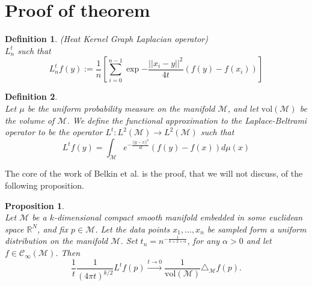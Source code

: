 \documentclass{article} %
\newtheorem{definition}{Definition}[section]
\newtheorem{prop}{Proposition}
\begin{document}




\newpage
{\LARGE {}}
\appendix

\section{Proof of theorem}

\begin{definition}{}(Heat Kernel Graph Laplacian operator)\\
	\label{def:Heat Kernel Graph Laplacian operator}
	$L_n^t$ such that
	$$L_n^tf(y) := \frac{1}{n}\left[ \sum_{i=0}^{n-1} \exp{-\frac{||x_i-y||^2}{4t}}\left(f(y)-f(x_i)\right)\right]$$
\end{definition}
\begin{definition}{} \cite{Belkin:2005:TTF:2138147.2138189}\\ \label{eq: my L^t} Let $\mu$ be the uniform probability measure on the manifold $\mathcal M$, and let $\text{vol}(\mathcal M)$ be the volume of $\mathcal M$. We define the functional approximation to the Laplace-Beltrami operator to be the operator $L^t: L^{2}(\mathcal{M}) \rightarrow L^{2}(\mathcal{M})$ such that
	\label{def:Functional approximation to the Laplace-Beltrami operator}
	$$ L^tf(y) = \int_{\mathcal M}e^{-\frac{||y-x||^2}{4t}}\left(f(y)-f(x)\right)d\mu(x)$$
\end{definition}

The core of the work of Belkin et al. is the proof, that we will not discuss, of the following proposition.

\begin{prop} \cite{Belkin:2005:TTF:2138147.2138189} \\
Let $\mathcal M$ be a $k$-dimensional compact smooth manifold embedded in some euclidean space $\mathbb R^N$, and fix $p\in\mathcal M$. Let the data points $x_1, \dots, x_n$ be sampled form a uniform distribution on the manifold $\mathcal M$. Set $t_n=n^{-\frac{1}{k+2+\alpha}}$, for any $\alpha>0$ and let $f\in\mathcal C_\infty(\mathcal M)$. Then
	$$\frac{1}{t}\frac{1}{(4\pi t)^{k/2}} L^tf(p) \xrightarrow{t\to 0 } \frac{1}{\text{vol}(\mathcal M)}\triangle_{\mathcal M}f(p).$$
	\label{prop:3}
\end{prop}
\end{document}
